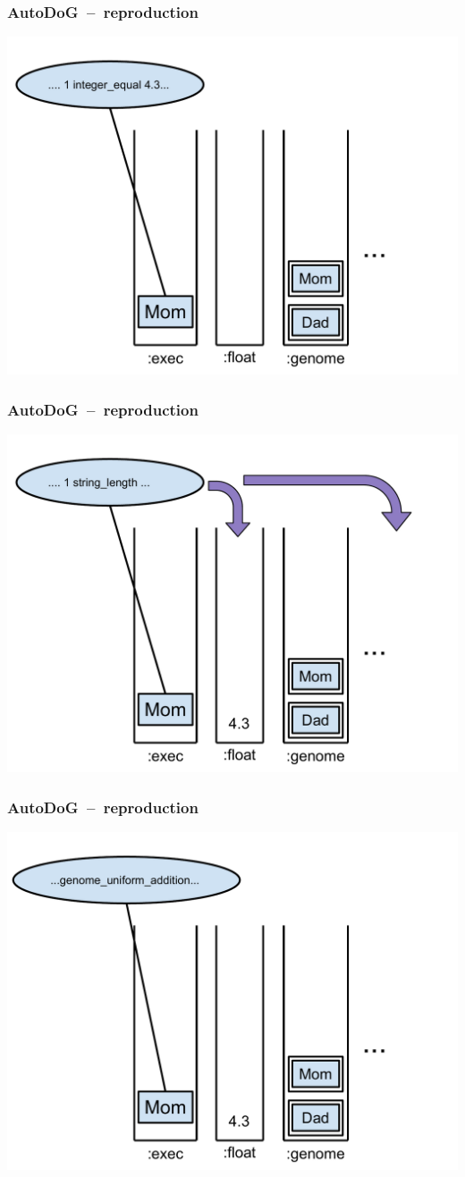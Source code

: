 \documentclass{beamer}
\begin{document}
\begin{frame}
	\frametitle{AutoDoG~--~reproduction}
	\includegraphics[width=.9\textwidth]{Illustrations/autodog_5.PDF}
\end{frame}

\begin{frame}
	\frametitle{AutoDoG~--~reproduction}
	\includegraphics[width=.9\textwidth]{Illustrations/autodog_6.PDF}
\end{frame}

\begin{frame}
	\frametitle{AutoDoG~--~reproduction}
	\includegraphics[width=.9\textwidth]{Illustrations/autodog_7.PDF}
\end{frame}
\end{document}
